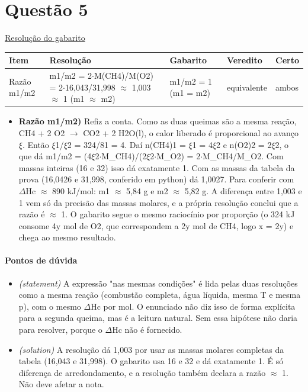 \documentclass{article}%
\begin{document}
\section*{Questão 5}%
\href{https://poliedroresolve.sistemapoliedro.com.br/vestibulares/ime/2026/ime-2-fase-dia-3-25-10-2025-2-fase-dia-3/dissertativa-5-quimica-2-fase-dia-3-ime-2026}{Resolução do gabarito}\par\smallskip%
\begin{longtable}{@{}p{} p{} p{} p{} p{}@{}}\toprule Item & Resolução & Gabarito & Veredito & Certo \\ \midrule
Razão m1/m2 & m1/m2 = 2$\cdot$M(CH4)/M(O2) = 2$\cdot$16,043/31,998 $\approx$ 1,003 $\approx$ 1 (m1 $\approx$ m2) & m1/m2 = 1 (m1 = m2) & equivalente & ambos \\
\bottomrule\end{longtable}%
\begin{itemize}%
\item%
\textbf{Razão m1/m2)} Refiz a conta. Como as duas queimas são a mesma reação, CH4 + 2 O2 $\to$ CO2 + 2 H2O(l), o calor liberado é proporcional ao avanço $\xi$. Então $\xi$1/$\xi$2 = 324/81 = 4. Daí n(CH4)1 = $\xi$1 = 4$\xi$2 e n(O2)2 = 2$\xi$2, o que dá m1/m2 = (4$\xi$2$\cdot$M\_CH4)/(2$\xi$2$\cdot$M\_O2) = 2$\cdot$M\_CH4/M\_O2. Com massas inteiras (16 e 32) isso dá exatamente 1. Com as massas da tabela da prova (16,0426 e 31,998, conferido em python) dá 1,0027. Para conferir com $\Delta$Hc $\approx$ 890 kJ/mol: m1 $\approx$ 5,84 g e m2 $\approx$ 5,82 g. A diferença entre 1,003 e 1 vem só da precisão das massas molares, e a própria resolução conclui que a razão é $\approx$ 1. O gabarito segue o mesmo raciocínio por proporção (o 324 kJ consome 4y mol de O2, que correspondem a 2y mol de CH4, logo x = 2y) e chega ao mesmo resultado.%
\end{itemize}%
\paragraph{Pontos de dúvida}%
\begin{itemize}%
\item%
\textit{(statement)} A expressão "nas mesmas condições" é lida pelas duas resoluções como a mesma reação (combustão completa, água líquida, mesma T e mesma p), com o mesmo $\Delta$Hc por mol. O enunciado não diz isso de forma explícita para a segunda queima, mas é a leitura natural. Sem essa hipótese não daria para resolver, porque o $\Delta$Hc não é fornecido.%
\item%
\textit{(solution)} A resolução dá 1,003 por usar as massas molares completas da tabela (16,043 e 31,998). O gabarito usa 16 e 32 e dá exatamente 1. É só diferença de arredondamento, e a resolução também declara a razão $\approx$ 1. Não deve afetar a nota.%
\end{itemize}%
\end{document}

